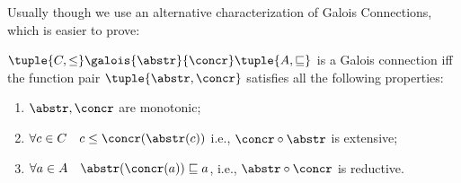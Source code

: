 Usually though we use an alternative characterization of Galois
Connections, which is easier to prove:

\begin{theorem}\label{th:alternate}
  \(\tuple{C, \leq} \galois{\abstr}{\concr} \tuple{A, \sqsubseteq}\)
  is a Galois connection iff the function pair
  \(\tuple{\abstr,\concr}\) satisfies all the following properties:
  \begin{enumerate}[label=(\arabic*)]
  \item \(\abstr, \concr\) are monotonic;
  \item \(\forall c \in C \quad c \leq \concr(\abstr(c))\) i.e.,
    \(\concr \circ \abstr\) is extensive;
  \item \(\forall a \in A \quad \abstr(\concr(a)) \sqsubseteq a\),
    i.e., \(\abstr \circ \concr\) is reductive.
  \end{enumerate}
\end{theorem}

